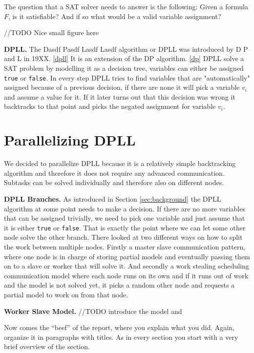 \documentclass[letterpaper]{article}
\newcommand{\mypar}[1]{{\bf #1.}}
\begin{document}
The question that a SAT solver needs to answer is the following:
Given a formula $F$, is it satisfiable?
And if so what would be a valid variable assignment?

//TODO Nice small figure here

\mypar{DPLL}
The Dasdf Pasdf Lasdf Lasdf algorithm or DPLL was introduced by D P and L in 19XX. \ref{dpll}
It is an extension of the DP algorithm. \ref{dp}
DPLL solve a SAT problem by modelling it as a decision tree, variables can either be assigned \texttt{true} or \texttt{false}.
In every step DPLL tries to find variables that are "automatically" assigned because of a previous decision,
if there are none it will pick a variable $v_i$ and assume a value for it.
If it later turns out that this decision was wrong it backtracks to that point and picks the negated assignment for variable $v_i$.

\section{Parallelizing DPLL}\label{sec:parallel_dpll}

We decided to parallelize DPLL because it is a relatively simple backtracking algorithm and therefore it does not require any advanced communication.
Subtasks can be solved individually and therefore also on different nodes.

\mypar{DPLL Branches}
As introduced in Section \ref{sec:background} the DPLL algorithm at some point needs to make a decision.
If there are no more variables that can be assigned trivially, we need to pick one variable and just assume that it is either \texttt{true} or \texttt{false}.
That is exactly the point where we can let some other node solve the other branch.
There looked at two different ways on how to split the work between multiple nodes.
Firstly a master slave communication pattern, where one node is in charge of storing partial models and eventually passing them on to a slave or worker that will solve it.
And secondly a work stealing scheduling communication model where each node runs on its own and if it runs out of work and the model is not solved yet,
it picks a random other node and requests a partial model to work on from that node.

\mypar{Worker Slave Model}
//TODO introduce the model and

Now comes the ``beef'' of the report, where you explain what you
did. Again, organize it in paragraphs with titles. As in every section
you start with a very brief overview of the section.
\end{document}
